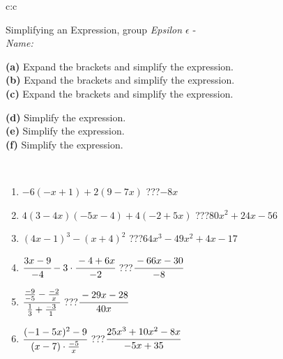 \documentclass[10pt]{report}
\begin{document}
\newpage
\thispagestyle{empty}
\begin{tabular}{c:c}
\begin{minipage}[c][104.5mm][t]{0.5\linewidth}
\begin{center}
\vspace{7mm}
{\huge Simplifying an Expression, group \textit{Epsilon $\epsilon$} -}\\[5mm]
\textit{Name:}\phantom{xxxxxxxxxxxxxxxxxxxxxxxxxxxxxxxxxxxxxxxxxxxxxxxxxxxxxxxxxxxxxxxxx}\\[5mm]
\begin{minipage}{0.95\linewidth}
\begin{center}
{\small \begin{minipage}{0.6\textwidth}
\textbf{(a)} Expand the brackets and simplify the expression. \\[1mm]
\textbf{(b)} Expand the brackets and simplify the expression. \\[1mm]
\textbf{(c)} Expand the brackets and simplify the expression.
\end{minipage} \begin{minipage}{0.39\textwidth}
\textbf{(d)} Simplify the expression. \\[1mm]
\textbf{(e)} Simplify the expression. \\[1mm]
\textbf{(f)} Simplify the expression.
\end{minipage}
}
\end{center}
\end{minipage}
\\[4mm]
\begin{minipage}{0.79\linewidth}
\begin{center}
\begin{varwidth}{\linewidth}
\begin{enumerate}
\normalsize
\item $-6(-x+1)+2(9-7x)$\quad \dotfill\; ???\;\dotfill \quad $-8x$
\item $4(3-4x)(-5x-4)+4(-2+5x)$\quad \dotfill\; ???\;\dotfill \quad $80x^2+24x-56$
\item $(4x-1)^3-(x+4)^2$\quad \dotfill\; ???\;\dotfill \quad $64x^3-49x^2+4x-17$
\item $\cfrac{3x-9}{-4}-3\cdot\cfrac{-4+6x}{-2}$\quad \dotfill\; ???\;\dotfill \quad $\cfrac{-66x-30}{-8}$
\item $\cfrac{\frac{-9}{-5}-\frac{-2}{x}}{\frac{1}{3}+\frac{-3}{1}}$\quad \dotfill\; ???\;\dotfill \quad $\cfrac{-29x-28}{40x}$
\item $\cfrac{(-1-5x)^2-9}{(x-7)\cdot\frac{-5}{x}}$\quad \dotfill\; ???\;\dotfill \quad $\cfrac{25x^3+10x^2-8x}{-5x+35}$

\end{enumerate}
\end{varwidth}
\end{center}
\end{minipage}
\end{center}
\end{minipage}
\end{tabular}
\end{document}
